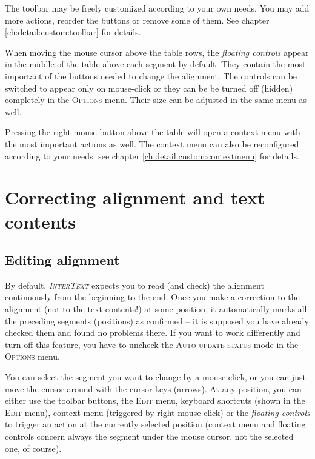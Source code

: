 \documentclass[a4paper,10pt,oneside]{book}
\newcommand{\IT}{\textit{\textsc{InterText}}\xspace}
\newcommand{\menu}[1]{\textsc{#1}}
\begin{document}
The toolbar may be freely customized according to your own needs. You may add more actions, reorder the buttons or remove some of them. See chapter \ref{ch:detail:custom:toolbar} for details.

When moving the mouse cursor above the table rows, the \emph{floating controls} appear in the middle of the table above each segment by default. They contain the most important of the buttons needed to change the alignment. The controls can be switched to appear only on mouse-click or they can be be turned off (hidden) completely in the \menu{Options} menu. Their size can be adjusted in the same menu as well.

Pressing the right mouse button above the table will open a context menu with the most important actions as well. The context menu can also be reconfigured according to your needs: see chapter \ref{ch:detail:custom:contextmenu} for details.

\chapter{Correcting alignment and text contents}\label{ch:howto:edit}

\section{Editing alignment}\label{ch:howto:edit_alignment}

By default, \IT expects you to read (and check) the alignment continuously from the beginning to the end. Once you make a correction to the alignment (not to the text contents!) at some position, it automatically marks all the preceding segments (positions) as confirmed -- it is supposed you have already checked them and found no problems there. If you want to work differently and turn off this feature, you have to uncheck the \menu{Auto update status} mode in the \menu{Options} menu.

You can select the segment you want to change by a mouse click, or you can just move the cursor around with the cursor keys (arrows). At any position, you can either use the toolbar buttons, the \menu{Edit} menu, keyboard shortcuts (shown in the \menu{Edit} menu), context menu (triggered by right mouse-click) or the \emph{floating controls} to trigger an action at the currently selected position (context menu and floating controls concern always the segment under the mouse cursor, not the selected one, of course).
\end{document}
